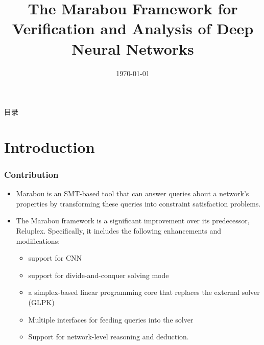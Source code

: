 \documentclass[aspectratio=169%
,serif,mathserif]{beamer}
\begin{document}
\title{The Marabou Framework for Verification and Analysis of Deep Neural Networks} %
\institute[ISCAS] %
{	
}
	\CTEXoptions[today=old]
	\date{\today} %
\begin{frame}[plain]\vspace{1.5em}
\titlepage\vspace{-0.5cm}
\end{frame}
\begin{frame}{目录}
\tableofcontents
\end{frame}

\section{Introduction} %
\begin{frame}
	\frametitle{Contribution}
	\begin{itemize}
		\item Marabou is an SMT-based tool that can answer queries about a network's properties by transforming these queries into constraint satisfaction problems.
		\item The Marabou framework is a significant improvement over its predecessor,
		Reluplex. Specifically, it includes the following enhancements and modifications: 
		\begin{itemize}
			\item support for CNN
			\item support for divide-and-conquer solving mode
			\item a simplex-based linear programming core that replaces the external solver (GLPK)
			\item Multiple interfaces for feeding queries into the solver
			\item Support for network-level reasoning and deduction.
		\end{itemize}
	\end{itemize}

\end{frame}
\end{document}
